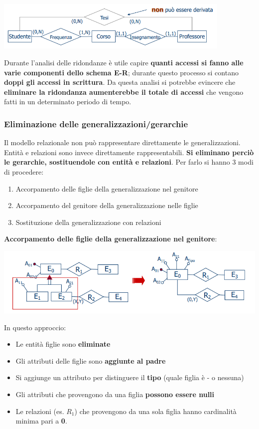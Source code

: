 \documentclass[12pt]{article}
\begin{document}
\begin{center}
    \includegraphics[width = 0.85\textwidth]{Images/98.PNG}
\end{center}
Durante l'analisi delle ridondanze è utile capire \textbf{quanti accessi si fanno alle varie componenti dello schema E-R};
durante questo processo si contano \textbf{doppi gli accessi in scrittura}.
Da questa analisi si potrebbe evincere che \textbf{eliminare la ridondanza aumenterebbe il totale di accessi} che vengono fatti in un determinato periodo di tempo.
\subsubsection{Eliminazione delle generalizzazioni/gerarchie}
Il modello relazionale non può rappresentare direttamente le generalizzazioni.
Entità e relazioni sono invece direttamente rappresentabili.
\textbf{Si eliminano perciò le gerarchie, sostituendole con entità e relazioni}.
Per farlo si hanno 3 modi di procedere:
\begin{enumerate}
    \item Accorpamento delle figlie della generalizzazione nel genitore
    \item Accorpamento del genitore della generalizzazione nelle figlie
    \item Sostituzione della generalizzazione con relazioni
\end{enumerate}
\textbf{Accorpamento delle figlie della generalizzazione nel genitore}: \newline
\begin{center}
    \includegraphics[width = 1\textwidth]{Images/99.PNG}
\end{center}
In questo approccio:
\begin{itemize}
    \item Le entità figlie sono \textbf{eliminate}
    \item Gli attributi delle figlie sono \textbf{aggiunte al padre}
    \item Si aggiunge un attributo per distinguere il \textbf{tipo} (quale figlia è - o nessuna)
    \item Gli attributi che provengono da una figlia \textbf{possono essere nulli}
    \item Le relazioni (es. $R_1$) che provengono da una sola figlia hanno cardinalità minima pari a \textbf{0}.
\end{itemize}
\end{document}
